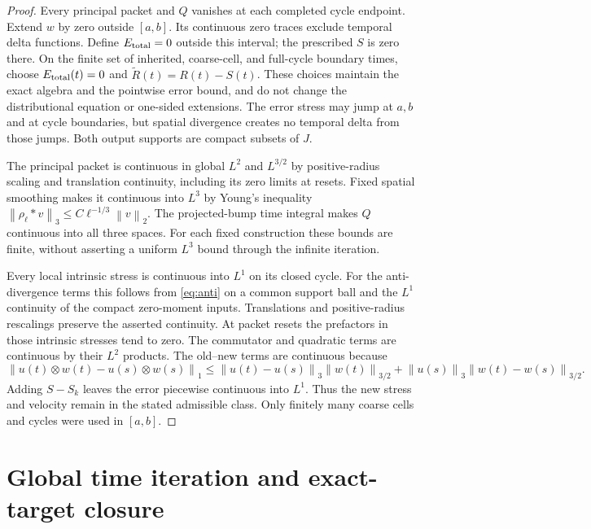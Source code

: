 \documentclass[11pt]{article}
\theoremstyle{remark}\newtheorem{remark}[theorem]{Remark}
\newcommand{\norm}[2]{\left\|#1\right\|_{#2}}
\begin{document}
\begin{proof}
Every principal packet and $Q$ vanishes at each completed cycle endpoint.
Extend $w$ by zero outside $[a,b]$.
Its continuous zero traces exclude temporal delta functions.
Define $E_{\rm total}=0$ outside this interval; the prescribed $S$ is zero there.
On the finite set of inherited, coarse-cell, and full-cycle boundary times,
choose $E_{\rm total}(t)=0$ and
$\widetilde R(t)=R(t)-S(t)$.
These choices maintain the exact algebra and the pointwise error bound,
and do not change the distributional equation or one-sided extensions.
The error stress may jump at $a,b$ and at cycle boundaries, but spatial
divergence creates no temporal delta from those jumps.
Both output supports are compact subsets of $J$.

The principal packet is continuous in global $L^2$ and $L^{3/2}$ by
positive-radius scaling and translation continuity, including its zero limits
at resets.
Fixed spatial smoothing makes it continuous into $L^3$ by Young's inequality
$\norm{\rho_\ell*v}3\leq C\ell^{-1/3}\norm v2$.
The projected-bump time integral makes $Q$ continuous into all three spaces.
For each fixed construction these bounds are finite, without asserting a
uniform $L^3$ bound through the infinite iteration.

Every local intrinsic stress is continuous into $L^1$ on its closed cycle.
For the anti-divergence terms this follows from \eqref{eq:anti} on a common
support ball and the $L^1$ continuity of the compact zero-moment inputs.
Translations and positive-radius rescalings preserve the asserted continuity.
At packet resets the prefactors in those intrinsic stresses tend to zero.
The commutator and quadratic terms are continuous by their $L^2$ products.
The old--new terms are continuous because
\[
 \norm{u(t)\otimes w(t)-u(s)\otimes w(s)}1
 \leq\norm{u(t)-u(s)}3\norm{w(t)}{3/2}
 +\norm{u(s)}3\norm{w(t)-w(s)}{3/2}.
\]
Adding $S-S_k$ leaves the error piecewise continuous into $L^1$.
Thus the new stress and velocity remain in the stated admissible class.
Only finitely many coarse cells and cycles were used in $[a,b]$.
\end{proof}

\section{Global time iteration and exact-target closure}
\end{document}
